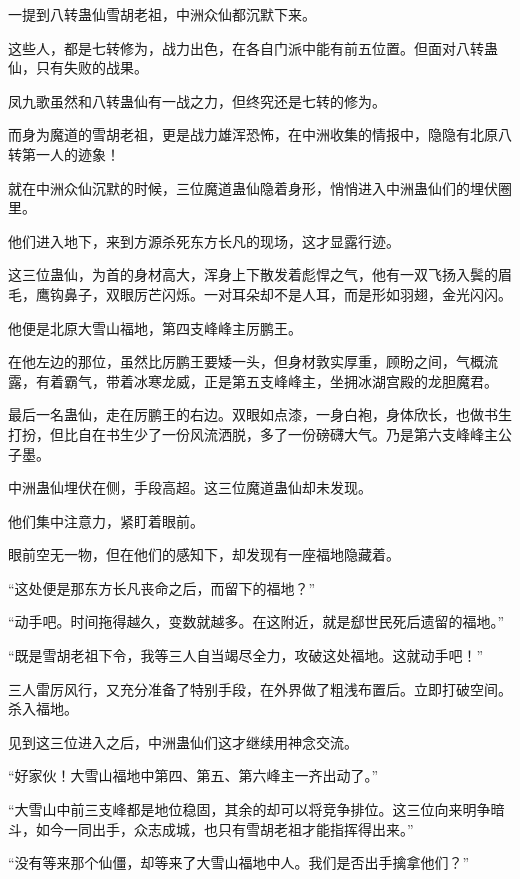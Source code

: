 
\begin{this_body}

一提到八转蛊仙雪胡老祖，中洲众仙都沉默下来。

这些人，都是七转修为，战力出色，在各自门派中能有前五位置。但面对八转蛊仙，只有失败的战果。

凤九歌虽然和八转蛊仙有一战之力，但终究还是七转的修为。

而身为魔道的雪胡老祖，更是战力雄浑恐怖，在中洲收集的情报中，隐隐有北原八转第一人的迹象！

就在中洲众仙沉默的时候，三位魔道蛊仙隐着身形，悄悄进入中洲蛊仙们的埋伏圈里。

他们进入地下，来到方源杀死东方长凡的现场，这才显露行迹。

这三位蛊仙，为首的身材高大，浑身上下散发着彪悍之气，他有一双飞扬入鬓的眉毛，鹰钩鼻子，双眼厉芒闪烁。一对耳朵却不是人耳，而是形如羽翅，金光闪闪。

他便是北原大雪山福地，第四支峰峰主厉鹏王。

在他左边的那位，虽然比厉鹏王要矮一头，但身材敦实厚重，顾盼之间，气概流露，有着霸气，带着冰寒龙威，正是第五支峰峰主，坐拥冰湖宫殿的龙胆魔君。

最后一名蛊仙，走在厉鹏王的右边。双眼如点漆，一身白袍，身体欣长，也做书生打扮，但比自在书生少了一份风流洒脱，多了一份磅礴大气。乃是第六支峰峰主公子墨。

中洲蛊仙埋伏在侧，手段高超。这三位魔道蛊仙却未发现。

他们集中注意力，紧盯着眼前。

眼前空无一物，但在他们的感知下，却发现有一座福地隐藏着。

“这处便是那东方长凡丧命之后，而留下的福地？”

“动手吧。时间拖得越久，变数就越多。在这附近，就是郄世民死后遗留的福地。”

“既是雪胡老祖下令，我等三人自当竭尽全力，攻破这处福地。这就动手吧！”

三人雷厉风行，又充分准备了特别手段，在外界做了粗浅布置后。立即打破空间。杀入福地。

见到这三位进入之后，中洲蛊仙们这才继续用神念交流。

“好家伙！大雪山福地中第四、第五、第六峰主一齐出动了。”

“大雪山中前三支峰都是地位稳固，其余的却可以将竞争排位。这三位向来明争暗斗，如今一同出手，众志成城，也只有雪胡老祖才能指挥得出来。”

“没有等来那个仙僵，却等来了大雪山福地中人。我们是否出手擒拿他们？”


\end{this_body}

